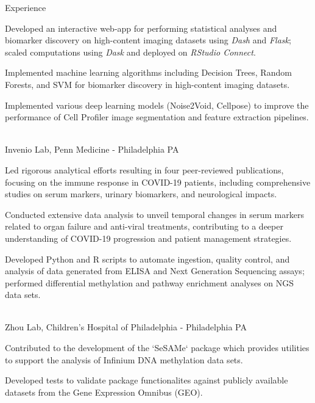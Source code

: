 \documentclass[]{resume-knyte}
\begin{document}
\begin{topic}{Experience}
{    \item Developed an interactive web-app for performing statistical analyses and biomarker discovery on high-content imaging datasets using \textit{Dash} and \textit{Flask}; scaled computations using \textit{Dask} and deployed on \textit{RStudio Connect}.
    \vspace{-5pt}

    \item Implemented machine learning algorithms including Decision Trees, Random Forests, and SVM for biomarker discovery in high-content imaging datasets.
    \vspace{-5pt}

    \item Implemented various deep learning models (Noise2Void, Cellpose) to improve the performance of Cell Profiler image segmentation and feature extraction pipelines.
    \vspace{-5pt}
    }\\

    {Invenio Lab, Penn Medicine - Philadelphia PA}
    {
        \item Led rigorous analytical efforts resulting in four peer-reviewed publications, focusing on the immune response in COVID-19 patients, including comprehensive studies on serum markers, urinary biomarkers, and neurological impacts.
        \vspace{-5pt}

        \item Conducted extensive data analysis to unveil temporal changes in serum markers related to organ failure and anti-viral treatments, contributing to a deeper understanding of COVID-19 progression and patient management strategies.
        \vspace{-5pt}
    
        \item Developed Python and R scripts to automate ingestion, quality control, and analysis of data generated from ELISA and Next Generation Sequencing assays; performed differential methylation and pathway enrichment analyses on NGS data sets.
        \vspace{-5pt}
    }\\

    {Zhou Lab, Children's Hospital of Philadelphia - Philadelphia PA}
    {
        \item Contributed to the development of the `SeSAMe` package which provides utilities to support the analysis of Infinium DNA methylation data sets.
        \vspace{-5pt}

        \item Developed tests to validate package functionalites against publicly available datasets from the Gene Expression Omnibus (GEO).
        \vspace{-5pt}
    }\\
\end{topic}
\end{document}
